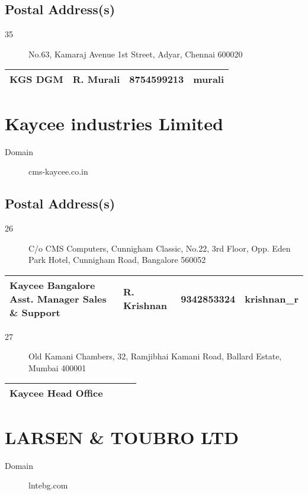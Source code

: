 \documentclass[a4paper, 11pt, twoside]{book}
\begin{document}
\subsection*{Postal Address(s)}
\begin{description}
\item [35]No.63, Kamaraj Avenue 1st Street, Adyar, Chennai 600020
\end{description}
\begin{tabular}{|p{4cm}|p{2cm}|p{2cm}|p{3cm}|}
\hline
KGS DGM & R. Murali & 8754599213 & murali \\ \hline
\end{tabular}
\section{Kaycee industries Limited}\label{com:25}
\begin{description}
\item[Domain]cms-kaycee.co.in
\end{description}
\subsection*{Postal Address(s)}
\begin{description}
\item [26]C/o CMS Computers, Cunnigham Classic, No.22, 3rd Floor, Opp. Eden Park Hotel, Cunnigham Road, Bangalore 560052
\end{description}
\begin{tabular}{|p{4cm}|p{2cm}|p{2cm}|p{3cm}|}
\hline
Kaycee Bangalore Asst. Manager Sales \& Support & R. Krishnan & 9342853324 & krishnan\_r \\ \hline
\end{tabular}
\begin{description}
\item [27]Old Kamani Chambers, 32, Ramjibhai Kamani Road, Ballard Estate, Mumbai 400001
\end{description}
\begin{tabular}{|p{4cm}|p{2cm}|p{2cm}|p{3cm}|}
\hline
Kaycee Head Office & & &  \\ \hline
\end{tabular}
\section{LARSEN \& TOUBRO LTD}\label{com:4}
\begin{description}
\item[Domain]lntebg.com
\end{description}
\end{document}
